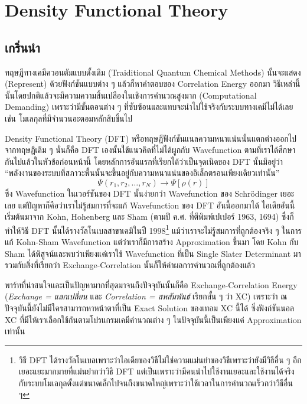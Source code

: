 
\chapter{Density Functional Theory}

\section{เกริ่นนำ}

ทฤษฎีทางเคมีควอนตัมแบบดั้งเดิม (Traiditional Quantum Chemical Methods) นั้นจะแสดง (Represent) ด้วยฟังก์ชันแบบต่าง ๆ แล้วก็หาคำตอบของ Correlation Energy ออกมา วิธีเหล่านี้นั้นโดยปกติแล้วจะมีความความสิ้นเปลืองในเชิงการคำนวณสูงมาก (Computational Demanding) เพราะว่ามีขั้นตอนต่าง ๆ ที่ซับซ้อนและแทบจะนำไปใช้จริงกับระบบทางเคมีไม่ได้เลย เช่น โมเลกุลที่มีจำนวนอะตอมหลักสิบขึ้นไป

Density Functional Theory (DFT) หรือทฤษฎีฟังก์ชันแนลความหนาแน่นนั้นแตกต่างออกไปจากทฤษฎีเดิม ๆ นั่นก็คือ DFT เองนั้นใช้แนวคิดที่ไม่ได้ผูกกับ Wavefunction ตามที่เราได้ศึกษากันไปแล้วในหัวข้อก่อนหน้านี้ โดยหลักการอันแรกที่เรียกได้ว่าเป็นจุดเนิดของ DFT นั้นมีอยู่ว่า \enquote{พลังงานของระบบที่สภาวะพื้นนั้นจะขึ้นอยู่กับความหนาแน่นของอิเล็กตรอนเพียงเดียวเท่านั้น}
%
\begin{equation}
    \Psi(r_{1}, r_{2}, \dots, r_{N}) \rightarrow \Psi[\rho(r)]
\end{equation}
%
\noindent ซึ่ง Wavefunction ในเวอร์ชันของ DFT นั้นง่ายกว่า Wavefunction ของ Schr\"{o}dinger เยอะเลย แต่ปัญหาก็คือว่าเราไม่รู้สมการที่จะแก้ Wavefunction ของ DFT อันนี้ออกมาได้ ไอเดียอันนี้เริ่มต้นมาจาก Kohn, Hohenberg และ Sham (ตามปี ค.ศ. ที่ตีพิมพ์เปเปอร์ 1963, 1694) ซึ่งก็ทำให้วิธี DFT นั้นได้รางวัลโนเบลสาขาเคมีในปี 1998\footnote{วิธี DFT ได้รางวัลโนเบลเพราะว่าไอเดียของวิธีไม่ใช่ความแม่นยำของวิธีเพราะว่ายังมีวิธีอื่น ๆ อีกเยอะแยะมากมายที่แม่นยำกว่าวิธี DFT แต่เป็นเพราะว่ามีคนนำไปใช้งานเยอะและใช้งานได้จริงกับระบบโมเลกุลตั้งแต่ขนาดเล็กไปจนถึงขนาดใหญ่เพราะว่าใช้เวลาในการคำนวณเร็วกว่าวิธีอื่น ๆ} แม้ว่าเราจะไม่รู้สมการที่ถูกต้องจริง ๆ ในการแก้ Kohn-Sham Wavefunction แต่ว่าเราก็มีการสร้าง Approximation ขึ้นมา โดย Kohn กับ Sham ได้พิสูจน์และพบว่าเพียงแค่เราใช้ Wavefunction ที่เป็น Single Slater Determinant มารวมกับสิ่งที่เรียกว่า Exchange-Correlation นั้นก็ให้ค่าผลการคำนวณที่ถูกต้องแล้ว

พาร์ทที่น่าสนใจและเป็นปัญหามากที่สุดมาจนถึงปัจจุบันนั้นก็คือ Exchange-Correlation Energy (\textit{Exchange = แลกเปลี่ยน} และ \textit{Correlation = สหสัมพันธ์} เรียกสั้น ๆ ว่า XC)  เพราะว่า ณ ปัจจุบันนี้ยังไม่มีใครสามารถหาหน้าตาที่เป็น Exact Solution ของเทอม XC นี้ได้ ซึ่งฟังก์ชันนอล XC ที่มีให้เราเลือกใช้กันตามโปรแกรมเคมีคำนวณต่าง ๆ ในปัจจุบันนี้เป็นเพียงแค่ Approximation เท่านั้น


